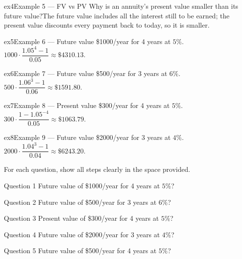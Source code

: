 \documentclass[11pt]{article}
\begin{document}
\begin{example}{ex4}{Example 5 --- FV vs PV}
Why is an annuity's present value smaller than its future value?\soln The future value includes all the interest still to be earned; the present value discounts every payment back to today, so it is smaller.
\end{example}

\begin{example}{ex5}{Example 6 --- Future value}
\$1000/year for 4 years at $5\%$.\soln $1000\cdot\dfrac{1.05^4-1}{0.05}\approx\$4310.13$.
\end{example}

\begin{example}{ex6}{Example 7 --- Future value}
\$500/year for 3 years at $6\%$.\soln $500\cdot\dfrac{1.06^3-1}{0.06}\approx\$1591.80$.
\end{example}

\begin{example}{ex7}{Example 8 --- Present value}
\$300/year for 4 years at $5\%$.\soln $300\cdot\dfrac{1-1.05^{-4}}{0.05}\approx\$1063.79$.
\end{example}

\begin{example}{ex8}{Example 9 --- Future value}
\$2000/year for 3 years at $4\%$.\soln $2000\cdot\dfrac{1.04^3-1}{0.04}\approx\$6243.20$.
\end{example}

\clearpage
{}
For each question, show all steps clearly in the space provided.

\begin{qbox}{Question 1}
Future value of \$1000/year for 4 years at $5\%$?\workspace{2.4cm}
\end{qbox}

\begin{qbox}{Question 2}
Future value of \$500/year for 3 years at $6\%$?\workspace{2.4cm}
\end{qbox}

\begin{qbox}{Question 3}
Present value of \$300/year for 4 years at $5\%$?\workspace{2.4cm}
\end{qbox}

\begin{qbox}{Question 4}
Future value of \$2000/year for 3 years at $4\%$?\workspace{2.4cm}
\end{qbox}

\begin{qbox}{Question 5}
Future value of \$500/year for 4 years at $5\%$?\workspace{2.4cm}
\end{qbox}
\end{document}
